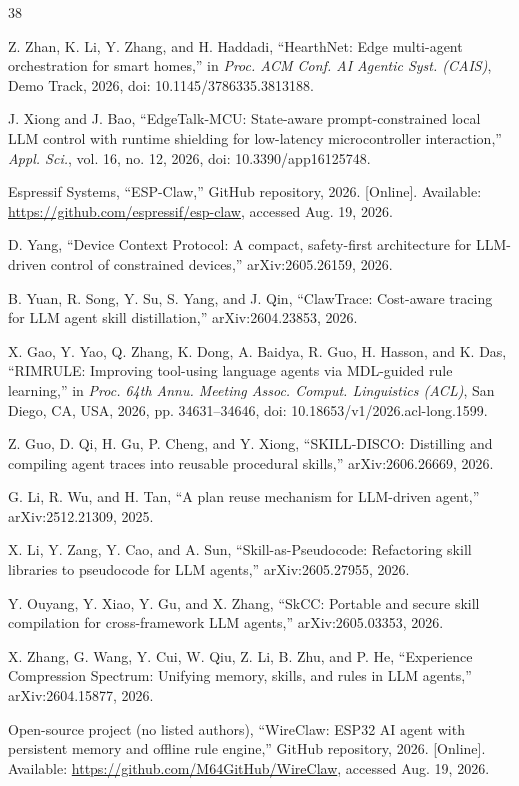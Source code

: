 \documentclass[11pt,a4paper]{article}
\begin{document}
\begin{thebibliography}{38}

 Z. Zhan, K. Li, Y. Zhang, and H. Haddadi, ``HearthNet: Edge
multi-agent orchestration for smart homes,'' in \emph{Proc. ACM Conf. AI
Agentic Syst. (CAIS)}, Demo Track, 2026, doi: 10.1145/3786335.3813188.

 J. Xiong and J. Bao, ``EdgeTalk-MCU: State-aware prompt-constrained
local LLM control with runtime shielding for low-latency microcontroller
interaction,'' \emph{Appl. Sci.}, vol. 16, no. 12, 2026, doi:
10.3390/app16125748.

 Espressif Systems, ``ESP-Claw,'' GitHub repository, 2026.
[Online]. Available: \url{https://github.com/espressif/esp-claw}, accessed
Aug. 19, 2026.

 D. Yang, ``Device Context Protocol: A compact, safety-first
architecture for LLM-driven control of constrained devices,''
arXiv:2605.26159, 2026.

 B. Yuan, R. Song, Y. Su, S. Yang, and J. Qin, ``ClawTrace:
Cost-aware tracing for LLM agent skill distillation,'' arXiv:2604.23853,
2026.

 X. Gao, Y. Yao, Q. Zhang, K. Dong, A. Baidya, R. Guo, H. Hasson,
and K. Das, ``RIMRULE: Improving tool-using language agents via MDL-guided
rule learning,'' in \emph{Proc. 64th Annu. Meeting Assoc. Comput. Linguistics
(ACL)}, San Diego, CA, USA, 2026, pp. 34631--34646, doi:
10.18653/v1/2026.acl-long.1599.

 Z. Guo, D. Qi, H. Gu, P. Cheng, and Y. Xiong, ``SKILL-DISCO:
Distilling and compiling agent traces into reusable procedural skills,''
arXiv:2606.26669, 2026.

 G. Li, R. Wu, and H. Tan, ``A plan reuse mechanism for LLM-driven
agent,'' arXiv:2512.21309, 2025.

 X. Li, Y. Zang, Y. Cao, and A. Sun, ``Skill-as-Pseudocode:
Refactoring skill libraries to pseudocode for LLM agents,'' arXiv:2605.27955,
2026.

 Y. Ouyang, Y. Xiao, Y. Gu, and X. Zhang, ``SkCC: Portable and
secure skill compilation for cross-framework LLM agents,'' arXiv:2605.03353,
2026.

 X. Zhang, G. Wang, Y. Cui, W. Qiu, Z. Li, B. Zhu, and P. He,
``Experience Compression Spectrum: Unifying memory, skills, and rules in LLM
agents,'' arXiv:2604.15877, 2026.

 Open-source project (no listed authors), ``WireClaw: ESP32 AI
agent with persistent memory and offline rule engine,'' GitHub repository,
2026. [Online]. Available:
\url{https://github.com/M64GitHub/WireClaw}, accessed Aug. 19, 2026.


\end{thebibliography}
\end{document}
